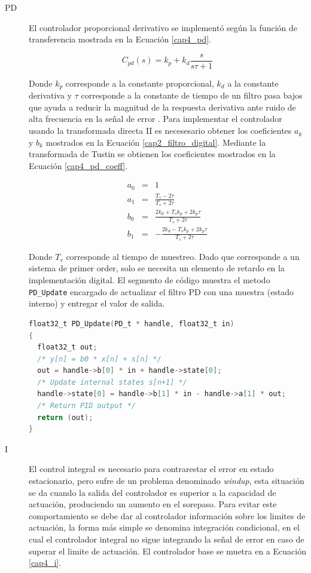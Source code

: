 \begin{description}

\item[PD] El controlador proporcional derivativo se implementó según la función de transferencia mostrada en la Ecuación \ref{cap4_pd}.

\begin{equation}\label{cap4_pd}
C_{pd}(s)=k_p + k_d \frac{s}{s\tau+1}
\end{equation}

Donde $k_p$ corresponde a la constante proporcional, $k_d$ a la constante derivativa y $\tau$ corresponde a la constante de tiempo de un filtro pasa bajos que ayuda a reducir la magnitud de la respuesta derivativa ante ruido de alta frecuencia en la señal de error \cite{finn}. Para implementar el controlador usando la transformada directa II es necesesario obtener los coeficientes $a_k$ y $b_k$ mostrados en la Ecuación \ref{cap2_filtro_digital}. Mediante la transformada de Tustin se obtienen los coeficientes mostrados en la Ecuación \ref{cap4_pd_coeff}.

\begin{eqnarray}\label{cap4_pd_coeff}
a_0 &=& 1\\
a_1 &=& \frac{T_s-2\tau}{T_s+2\tau}\\
b_0 &=& \frac{2 k_d+T_s k_p + 2 k_p \tau}{T_s+2\tau}\\
b_1 &=& -\frac{2 k_d-T_s k_p + 2 k_p \tau}{T_s+2\tau}
\end{eqnarray}

Donde $T_s$ corresponde al tiempo de muestreo. Dado que corresponde a un sistema de primer order, solo se necesita un elemento de retardo en la implementación digital. El segmento de código muestra el metodo \texttt{PD\_Update} encargado de actualizar el filtro PD con una muestra (estado interno) y entregar el valor de salida.

\begin{lstlisting}[language=C,style=csstyle, caption=Implementación \texttt{PD\_Update}, label=cap4_pd_impl]
float32_t PD_Update(PD_t * handle, float32_t in)
{
  float32_t out;
  /* y[n] = b0 * x[n] + s[n] */
  out = handle->b[0] * in + handle->state[0];
  /* Update internal states s[n+1] */
  handle->state[0] = handle->b[1] * in - handle->a[1] * out;
  /* Return PID output */
  return (out);
}
\end{lstlisting}

\item[I] El control integral es necesario para contrarestar el error en estado estacionario, pero sufre de un problema denominado \textit{windup}, esta situación se da cuando la salida del controlador es superior a la capacidad de actuación, produciendo un aumento en el sorepaso. Para evitar este comportamiento se debe dar al controlador información sobre los limites de actuación, la forma más simple se denomina integración condicional, en el cual el controlador integral no sigue integrando la señal de error en caso de superar el limite de actuación. El controlador base se muetra en a Ecuación \ref{cap4_i}.


\end{description}
